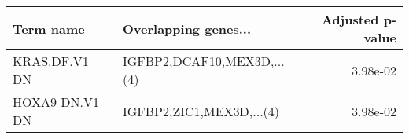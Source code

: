 \begin{tabular}{llr}
\toprule
     Term name &       Overlapping genes... &  Adjusted p-value \\
\midrule
 KRAS.DF.V1 DN & IGFBP2,DCAF10,MEX3D,...(4) &          3.98e-02 \\
HOXA9 DN.V1 DN &   IGFBP2,ZIC1,MEX3D,...(4) &          3.98e-02 \\
\bottomrule
\end{tabular}
